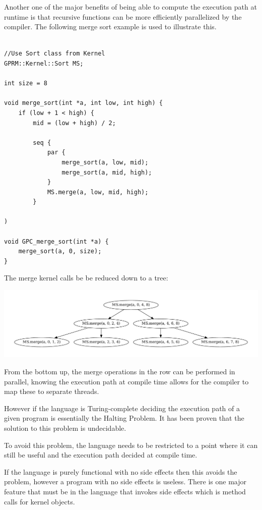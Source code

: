 Another one of the major benefits of being able to compute the execution
path at runtime is that recursive functions can be more efficiently parallelized
by the compiler. The following merge sort example is used to illustrate this.

\begin{lstlisting}[style=myGPC]

//Use Sort class from Kernel
GPRM::Kernel::Sort MS;

int size = 8

void merge_sort(int *a, int low, int high) {
    if (low + 1 < high) {
        mid = (low + high) / 2;
   
        seq {
            par {
                merge_sort(a, low, mid);
                merge_sort(a, mid, high);
            }
            MS.merge(a, low, mid, high);            
        }
    
)

void GPC_merge_sort(int *a) {
    merge_sort(a, 0, size);
}

\end{lstlisting}

The merge kernel calls be be reduced down to a tree:

\begin{center}
\includegraphics[scale=0.5]{graphs/mergesortTree.pdf}
\end{center}


From the bottom up, the merge operations in the row can be performed in
parallel, knowing the execution path at compile time allows for the compiler
to map these to separate threads. 


However if the language is Turing-complete deciding the execution path
of a given program is essentially the Halting Problem. It has been proven
that the solution to this problem is undecidable\cite{halting}. 

To avoid this problem, the language needs to be restricted to a point where it can still be useful and the execution
path decided at compile time.

If the language is purely functional with no side effects then this avoids the problem, however a program
with no side effects is useless. There is one major feature that must be in the language that invokes
side effects which is method calls for kernel objects. 


